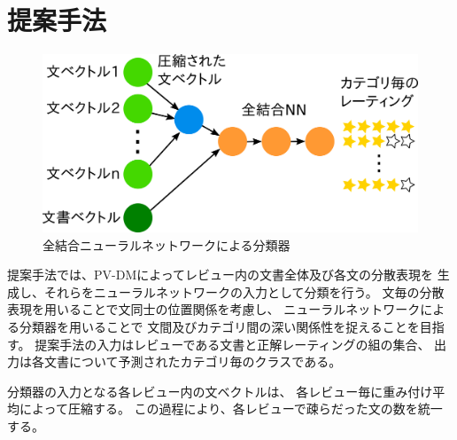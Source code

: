 \documentclass{ttisummary}
\makeatletter
\let\tti@includegraphics\includegraphics
\renewcommand{\includegraphics}[1]{\tti@includegraphics[width=\linewidth]{#1}}
\makeatother
\begin{document}
\section{提案手法}

\begin{figure}[t!]
  \includegraphics{fig/model.png}
  \caption{全結合ニューラルネットワークによる分類器}
  \label{fig:MyModel}
\end{figure}

提案手法では、PV-DMによってレビュー内の文書全体及び各文の分散表現を
生成し、それらをニューラルネットワークの入力として分類を行う。
文毎の分散表現を用いることで文同士の位置関係を考慮し、
ニューラルネットワークによる分類器を用いることで
文間及びカテゴリ間の深い関係性を捉えることを目指す。
提案手法の入力はレビューである文書と正解レーティングの組の集合、
出力は各文書について予測されたカテゴリ毎のクラスである。

分類器の入力となる各レビュー内の文ベクトルは、
各レビュー毎に重み付け平均によって圧縮する。
この過程により、各レビューで疎らだった文の数を統一する。
\end{document}
